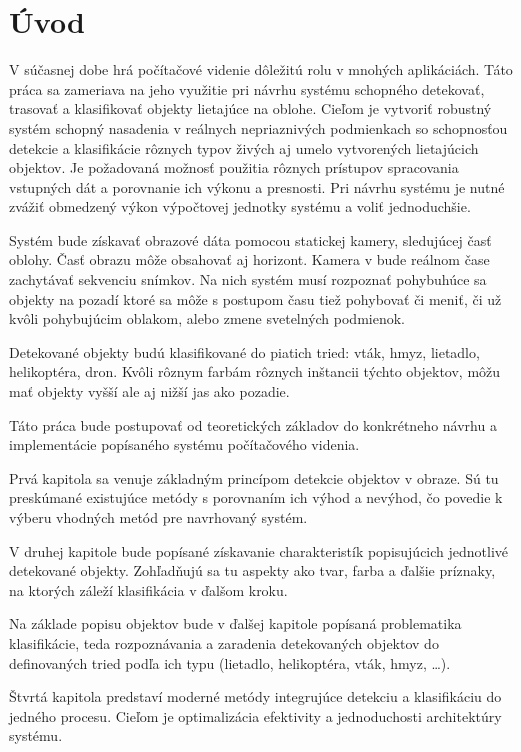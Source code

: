 \chapter*{Úvod}
{}

V súčasnej dobe hrá počítačové videnie dôležitú rolu v mnohých aplikáciách. Táto práca sa zameriava na jeho využitie pri návrhu systému schopného detekovať, trasovať a klasifikovať objekty lietajúce na oblohe. Cieľom je vytvoriť robustný systém schopný nasadenia v reálnych nepriaznivých podmienkach so schopnosťou detekcie a klasifikácie rôznych typov živých aj umelo vytvorených lietajúcich objektov. Je požadovaná možnosť použitia rôznych prístupov spracovania vstupných dát a porovnanie ich výkonu a presnosti. Pri návrhu systému je nutné zvážiť obmedzený výkon výpočtovej jednotky systému a voliť jednoduchšie.

Systém bude získavať obrazové dáta pomocou statickej kamery, sledujúcej časť oblohy. Časť obrazu môže obsahovať aj horizont. Kamera v bude reálnom čase zachytávať sekvenciu snímkov. Na nich systém musí rozpoznať pohybuhúce sa objekty na pozadí ktoré sa môže s postupom času tiež pohybovať či meniť, či už kvôli pohybujúcim oblakom, alebo zmene svetelných podmienok.

Detekované objekty budú klasifikované do piatich tried: vták, hmyz, lietadlo, helikoptéra, dron. Kvôli rôznym farbám rôznych inštancii týchto objektov, môžu mať objekty vyšší ale aj nižší jas ako pozadie.

Táto práca bude postupovať od teoretických základov do konkrétneho návrhu a implementácie popísaného systému počítačového videnia.

Prvá kapitola sa venuje základným princípom detekcie objektov v obraze. Sú tu preskúmané existujúce metódy s porovnaním ich výhod a nevýhod, čo povedie k výberu vhodných metód pre navrhovaný systém.

V druhej kapitole bude popísané získavanie charakteristík popisujúcich jednotlivé detekované objekty. Zohľadňujú sa tu aspekty ako tvar, farba a ďalšie príznaky, na ktorých záleží klasifikácia v ďalšom kroku.

Na základe popisu objektov bude v ďalšej kapitole popísaná problematika klasifikácie, teda rozpoznávania a zaradenia detekovaných objektov do definovaných tried podľa ich typu (lietadlo, helikoptéra, vták, hmyz, \dots).

Štvrtá kapitola predstaví moderné metódy integrujúce detekciu a klasifikáciu do jedného procesu. Cieľom je optimalizácia efektivity a jednoduchosti architektúry systému.

